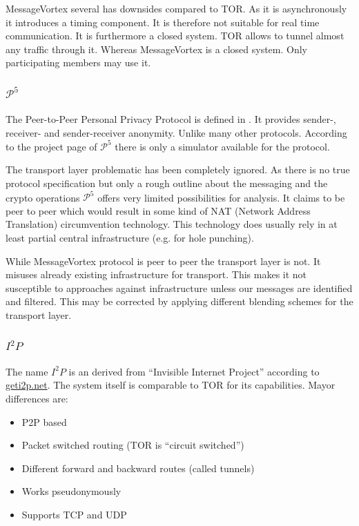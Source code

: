 \documentclass[9pt,journal,compsoc]{IEEEtran}
\begin{document}
MessageVortex several has downsides compared to TOR. As it is asynchronously it introduces a timing component. It is therefore not suitable for real time communication. It is furthermore a closed system. TOR allows to tunnel almost any traffic through it. Whereas MessageVortex is a closed system. Only participating members may use it. 

\subsubsection{$\mathcal{P}^5$}
The Peer-to-Peer Personal Privacy Protocol is defined in \cite{sherwood2005p5}. It provides sender-, receiver- and sender-receiver anonymity. Unlike many other protocols. According to the project page of $\mathcal{P}^5$ there is only a simulator available for the protocol.

The transport layer problematic has been completely ignored. As there is no true protocol specification but only a rough outline about the messaging and the crypto operations $\mathcal{P}^5$ offers very limited possibilities for analysis. It claims to be peer to peer which would result in some kind of NAT (Network Address Translation) circumvention technology. This technology does usually rely in at least partial central infrastructure (e.g. for hole punching). 

While MessageVortex protocol is peer to peer the transport layer is not. It misuses already existing infrastructure for transport. This makes it not susceptible to approaches against infrastructure unless our messages are identified and filtered. This may be corrected by applying different blending schemes for the transport layer. 

\subsubsection{$I^2P$}
The name $I^2P$ is an derived from  ``Invisible Internet Project'' according to \href{https://geti2p.net/}{geti2p.net}. The system itself is comparable to TOR for its capabilities. Mayor differences are:
\begin{itemize}
	\item P2P based
	\item Packet switched routing (TOR is ``circuit switched'')
	\item Different forward and backward routes (called tunnels)
	\item Works pseudonymously
	\item Supports TCP and UDP
\end{itemize}
\end{document}
